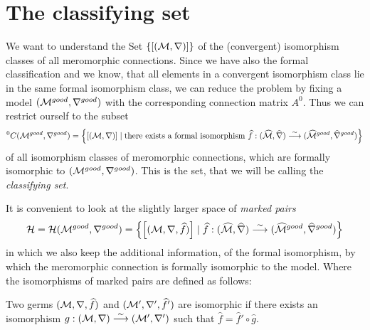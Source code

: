 \section{The classifying set}
We want to understand the Set $\{[(\mathcal{M},\nabla)]\}$ of the (convergent)
isomorphism classes of all meromorphic connections. Since we have also the
formal classification and we know, that all elements in a convergent
isomorphism class lie in the same formal isomorphism class, we can reduce the
problem by fixing a model $(\mathcal{M}^{good},\nabla^{good})$ with the corresponding
connection matrix $A^0$. Thus we can restrict ourself to the subset
\begin{align*}
  {}^0C(\mathcal{M}^{good},\nabla^{good})=\left\{
    \left[(\mathcal{M},\nabla)\right]
      \mid \text{there exists a formal isomorphism }
      \widehat f:(\widehat{\mathcal{M}},\widehat\nabla)
        \overset{\sim}\longrightarrow
        (\widehat{\mathcal{M}}^{good},\widehat\nabla^{good})
  \right\}
\end{align*}
of all isomorphism classes of
meromorphic connections, which are formally isomorphic to
$(\mathcal{M}^{good},\nabla^{good})$. This is the set, that we will be calling the
\emph{classifying set}.
\begin{comment}
  \begin{itemize}
    \item \cite{thboalch} p.6
      \begin{itemize}
        \item \cite{boalch} p.19
      \end{itemize}
    \item \cite{Loday1994} p.852
    \item \cite{sabbah2007isomonodromic} p.111
  \end{itemize}
\end{comment}

It is convenient to look at the slightly larger space of \emph{marked pairs}
\[
  \mathcal{H}=\mathcal{H}(\mathcal{M}^{good},\nabla^{good})=\left\{
    \left[(\mathcal{M},\nabla,\widehat f)\right]
      \mid
      \widehat f:(\widehat{\mathcal{M}},\widehat\nabla)
        \overset{\sim}\longrightarrow
        (\widehat{\mathcal{M}}^{good},\widehat\nabla^{good})
  \right\}
\]
in which we also keep the additional information, of the formal isomorphism, by
which the meromorphic connection is formally isomorphic to the model.
Where the isomorphisms of marked pairs are defined as follows:
\begin{defn}
  Two germs $(\mathcal{M},\nabla,\widehat f)$ and $(\mathcal{M}',\nabla',\widehat f')$ are
  isomorphic if there exists an isomorphism
  $g:(\mathcal{M},\nabla)\overset{\sim}\longrightarrow(\mathcal{M}',\nabla')$ such that
  $\hat f=\hat f'\circ \hat g$.
  \begin{comment}
    \cite[111]{sabbah2007isomonodromic}:\dots it is important to remark that
    such an isomorphism is then unique.
  \end{comment}
\end{defn}

